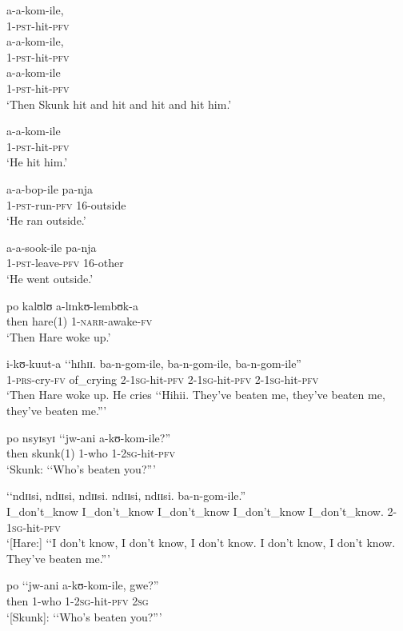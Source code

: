 \begin{exe}
\ex \gll a-a-kom-ile,\\
1-\textsc{pst}-hit-\textsc{pfv}\\
\ex \gll a-a-kom-ile,\\
1-\textsc{pst}-hit-\textsc{pfv}\\
\ex \gll a-a-kom-ile\\
1-\textsc{pst}-hit-\textsc{pfv}\\
\glt \lq Then Skunk hit and hit and hit and hit him.' 

\ex \gll a-a-kom-ile\\
1-\textsc{pst}-hit-\textsc{pfv}\\
\glt \lq He hit him.'

\ex \gll a-a-bop-ile pa-nja\\
1-\textsc{pst}-run-\textsc{pfv} 16-outside\\
\glt \lq He ran outside.'

\ex \gll a-a-sook-ile pa-nja\\
1-\textsc{pst}-leave-\textsc{pfv} 16-other\\
\glt \lq He went outside.'

\ex \gll po kalʊlʊ a-lɪnkʊ-lembʊk-a\\
then hare(1) 1-\textsc{narr}-awake-\textsc{fv}\\
\glt \lq Then Hare woke up.'

\ex \gll i-kʊ-kuut-a \lq \lq hɪhɪɪ. ba-n-gom-ile, ba-n-gom-ile, ba-n-gom-ile''\\
1-\textsc{prs}-cry-\textsc{fv} \phantom{\lq\lq}of\_crying 2-\textsc{1sg}-hit-\textsc{pfv} 2-\textsc{1sg}-hit-\textsc{pfv} 2-\textsc{1sg}-hit-\textsc{pfv}\\
\glt \lq Then Hare woke up. He cries \lq\lq Hihii. They've beaten me, they've beaten me, they've beaten me.''{}'


\ex \gll po nsyɪsyɪ \lq\lq jw-ani a-kʊ-kom-ile?''\\
then skunk(1) \phantom{\lq\lq}1-who 1-\textsc{2sg}-hit-\textsc{pfv}\\
\glt \lq Skunk: \lq\lq Who's beaten you?''{}'

\ex \gll \lq\lq ndɪɪsi, ndɪɪsi, ndɪɪsi. ndɪɪsi, ndɪɪsi. ba-n-gom-ile.''\\
\phantom{\lq\lq}I\_don't\_know I\_don't\_know I\_don't\_know I\_don't\_know I\_don't\_know. 2-\textsc{1sg}-hit-\textsc{pfv}\\
\glt \lq [Hare:] \lq\lq I don't know, I don't know, I don't know. I don't know, I don't know. They've beaten me.''{}'

\ex \gll po \lq\lq jw-ani a-kʊ-kom-ile, gwe?''\\
then \phantom{\lq\lq}1-who 1-\textsc{2sg}-hit-\textsc{pfv} \textsc{2sg}\\
\glt \lq [Skunk]: \lq\lq Who's beaten you?''{}'


\end{exe}
